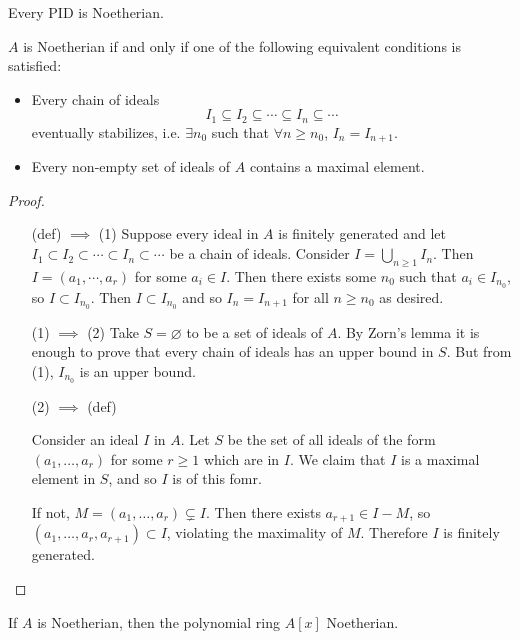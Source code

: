\begin{xmpl}
Every PID is Noetherian.
\end{xmpl}

\begin{prop}
$A$ is Noetherian if and only if one of the following equivalent
conditions is satisfied:
\begin{itemize}
  \item{
    Every chain of ideals
    $$
    I_1 \subseteq I_2 \subseteq \cdots \subseteq I_n \subseteq \cdots
    $$
    eventually stabilizes, i.e. $\exists n_0$ such that
    $\forall n \geq n_0$, $I_n = I_{n+1}$.
  }
  \item{
    Every non-empty set of ideals of $A$ contains a maximal element.
  }
\end{itemize}
\end{prop}

\begin{proof}
\begin{itemize}
  \item[(def) $\implies$ (1)]
  {
    Suppose every ideal in $A$ is finitely generated and let
    $I_1 \subset I_2 \subset \cdots \subset I_n \subset \cdots$ be a
    chain of ideals. Consider $I = \bigcup_{n \geq 1} I_n$. Then
    $I = (a_1, \cdots, a_r)$ for some $a_i \in I$. Then there exists
    some $n_0$ such that $a_i \in I_{n_0}$, so $I \subset
    I_{n_0}$. Then $I \subset I_{n_0}$ and so $I_n = I_{n+1}$ for all
    $n \geq n_0$ as desired.
  }
  \item[(1) $\implies$ (2)]
  {
    Take $S = \varnothing$ to be a set of ideals of $A$. By Zorn's
    lemma it is enough to prove that every chain of ideals has an
    upper bound in $S$. But from (1), $I_{n_0}$ is an upper bound.
  }
  \item[(2) $\implies$ (def)]
  {
    Consider an ideal $I$ in $A$. Let $S$ be the set of all ideals
    of the form $(a_1, \dots, a_r)$ for some $r \geq 1$ which are in
    $I$. We claim that $I$ is a maximal element in $S$, and so
    $I$ is of this fomr.

    If not, $M = (a_1, \dots, a_r) \subsetneq I$. Then there exists
    $a_{r+1} \in I - M$, so  $(a_1, \dots, a_r, a_{r+1}) \subset I$,
    violating the maximality of $M$. Therefore $I$ is finitely generated.
  }
\end{itemize}
\end{proof}

\begin{Theorem}
If $A$ is Noetherian, then the polynomial ring $A[x]$ Noetherian.
\end{Theorem}
